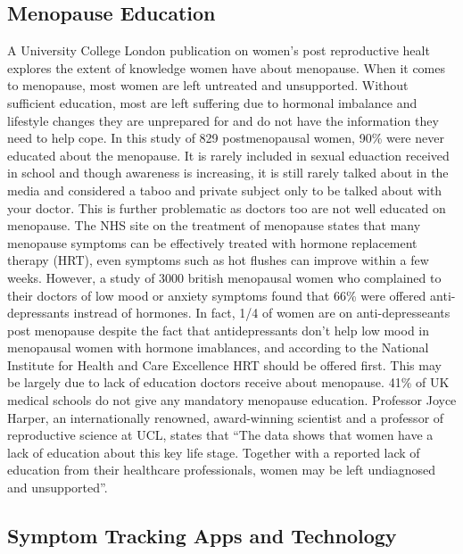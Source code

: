 \subsection{Menopause Education}
A University College London publication on women's post reproductive healt\cite{Aljumah2023} explores the extent of knowledge women have about menopause. When it comes to menopause, most women are left untreated and unsupported. Without sufficient education, most are left suffering due to hormonal imbalance and lifestyle changes they are unprepared for and do not have the information they need to help cope. In this study of 829 postmenopausal women, 90\% were never educated about the menopause. It is rarely included in sexual eduaction received in school and though awareness is increasing, it is still rarely talked about in the media and considered a taboo and private subject only to be talked about with your doctor\cite{Muir2022}. This is further problematic as doctors too are not well educated on menopause\cite{MenopauseSupport2021}. The NHS site on the treatment of menopause\cite{NHS2022} states that many menopause symptoms can be effectively treated with hormone replacement therapy (HRT), even symptoms such as hot flushes can improve within a few weeks. However, a study of 3000 british menopausal women who complained to their doctors of low mood or anxiety symptoms found that 66\% were offered anti-depressants instread of hormones\cite{NewsonHealth2019}. In fact, 1/4 of women are on anti-depresseants post menopause\cite{Brody2020} despite the fact that antidepressants don't help low mood in menopausal women with hormone imablances, and according to the National Institute for Health and Care Excellence\cite{NICE2019} HRT should be offered first. This may be largely due to lack of education doctors receive about menopause. 41\% of UK medical schools do not give any mandatory menopause education\cite{MenopauseSupport2021}. Professor Joyce Harper, an internationally renowned, award-winning scientist and a professor of reproductive science at UCL, states that “The data shows that women have a lack of education about this key life stage. Together with a reported lack of education from their healthcare professionals, women may be left undiagnosed and unsupported”\cite{UCL2023}.

\subsection{Symptom Tracking Apps and Technology}
